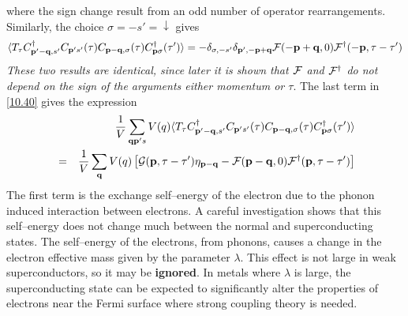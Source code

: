 where the sign change result from an odd number of operator rearrangements.
Similarly, the choice $\sigma = - s' = \downarrow$ gives
\begin{equation}
    \langle T_\tau C^\dagger_{\mathbf{p}'-\mathbf{q},s'} C_{\mathbf{p}'s'}(\tau) C_{\mathbf{p}-\mathbf{q},\sigma}(\tau) C^\dagger_{\mathbf{p}\sigma}(\tau') \rangle = - \delta_{\sigma,-s'} \delta_{\mathbf{p}',-\mathbf{p}+\mathbf{q}} \mathcal{F}(-\mathbf{p}+\mathbf{q},0) \mathcal{F}^\dagger(-\mathbf{p},\tau-\tau') \label{10.44}
\end{equation}
\textit{These two results are identical, since later it is shown that $\mathcal{F}$ and $\mathcal{F}^\dagger$ do not depend on the sign of the arguments either momentum or $\tau$}.
The last term in \eqref{10.40} gives the expression
\begin{eqnarray}\label{10.45}
    &~& \frac{1}{V} \sum_{\mathbf{q}\mathbf{p}'s} V(q)  \langle T_\tau C^\dagger_{\mathbf{p}'-\mathbf{q},s'} C_{\mathbf{p}'s'}(\tau) C_{\mathbf{p}-\mathbf{q},\sigma}(\tau) C^\dagger_{\mathbf{p}\sigma}(\tau') \rangle    \\ 
    &=& \frac{1}{V} \sum_{\mathbf{q}} V(q) \left[\mathcal{G}(\mathbf{p},\tau-\tau')\eta_{\mathbf{p}-\mathbf{q}} - \mathcal{F}(\mathbf{p}-\mathbf{q},0)\mathcal{F}^\dagger(\mathbf{p},\tau-\tau') \right] \nonumber
\end{eqnarray}
The first term is the exchange self--energy of the electron due to the phonon induced interaction between electrons.
A careful investigation shows that this self--energy does not change much between the normal and superconducting states.
The self--energy of the electrons, from phonons, causes a change in the electron effective mass given by the parameter $\lambda$.
This effect is not large in weak superconductors, so it may be \textbf{ignored}.
In metals where $\lambda$ is large, the superconducting state can be expected to significantly alter the properties of electrons near the Fermi surface where strong coupling theory is needed.

